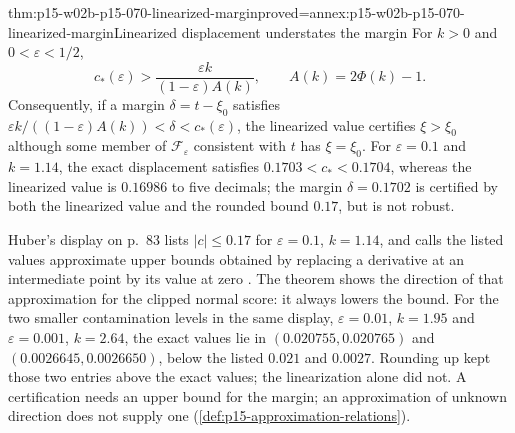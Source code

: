 \begin{hbtheorem}{thm:p15-w02b-p15-070-linearized-margin}{proved=annex:p15-w02b-p15-070-linearized-margin}{Linearized displacement understates the margin}
For \(k>0\) and \(0<\varepsilon<1/2\),
\[
 c_*(\varepsilon)>\frac{\varepsilon k}{(1-\varepsilon)A(k)},
 \qquad A(k)=2\Phi(k)-1.
\]
Consequently, if a margin \(\delta=t-\xi_0\) satisfies
\(\varepsilon k/((1-\varepsilon)A(k))<\delta<c_*(\varepsilon)\), the
linearized value certifies \(\xi>\xi_0\) although some member of
\(\mathcal F_\varepsilon\) consistent with \(t\) has \(\xi=\xi_0\).
For \(\varepsilon=0.1\) and \(k=1.14\), the exact displacement satisfies
\(0.1703<c_*<0.1704\), whereas the linearized value is \(0.16986\)
to five decimals; the margin \(\delta=0.1702\) is certified by both the
linearized value and the rounded bound \(0.17\), but is not robust.
\end{hbtheorem}

Huber's display on p.~83 lists \(|c|\leq0.17\) for \(\varepsilon=0.1\),
\(k=1.14\), and calls the listed values approximate upper bounds obtained
by replacing a derivative at an intermediate point by its value at zero
\cite[Sec.~7, p.~83]{Huber1964RobustLocation}. The theorem shows the
direction of that approximation for the clipped normal score: it always
lowers the bound. For the two smaller contamination levels in the same
display, \(\varepsilon=0.01\), \(k=1.95\) and \(\varepsilon=0.001\),
\(k=2.64\), the exact values lie in \((0.020755,0.020765)\) and
\((0.0026645,0.0026650)\), below the listed \(0.021\) and \(0.0027\).
Rounding up kept those two entries above the exact values; the
linearization alone did not. A certification needs
an upper bound for the margin; an approximation of unknown direction
does not supply one (\cref{def:p15-approximation-relations}).


